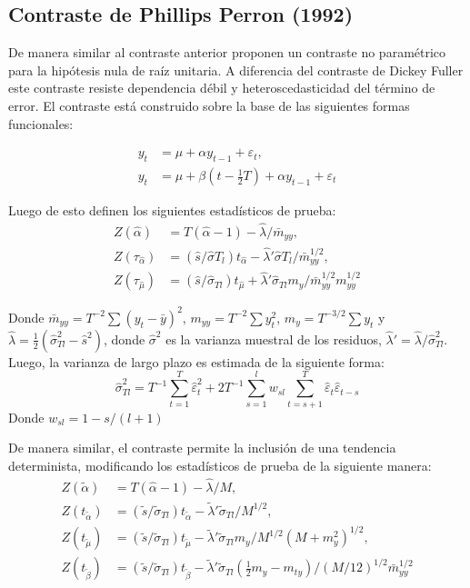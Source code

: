 \documentclass[12pt, twoside]{book}\usepackage[]{graphicx}\usepackage[]{color}
\numberwithin{equation}{section}
\numberwithin{theorem}{section}
\numberwithin{teorema}{section}
\numberwithin{defi}{section}
\numberwithin{prop}{section}
\numberwithin{defi}{section}
\theoremstyle{plain}
\begin{document}
\subsection{Contraste de Phillips Perron (1992)}

De manera similar al contraste anterior \cite{phillips1988} proponen un contraste no paramétrico para la hipótesis nula de raíz unitaria. A diferencia del contraste de Dickey Fuller este contraste resiste dependencia débil y heteroscedasticidad del término de error. El contraste está construido sobre la base de las siguientes formas funcionales: 

\begin{align}
y_{t} & = \mu+\alpha y_{t-1}+\varepsilon_{t}, \\ 
y_{t} & = \mu+\beta\left(t-\frac{1}{2}T\right)+\alpha y_{t-1}+\varepsilon_{t}
\end{align}

Luego de esto definen los siguientes estadísticos de prueba: 
\begin{align}
Z(\hat{\alpha}) & = T(\hat{\alpha}-1)-\hat{\lambda}/\bar{m}_{yy}, \label{eq:pp1}\\ 
Z(\tau_{\hat{\alpha}}) & = (\hat{s}/\hat{\sigma}T_{l})t_{\hat{\alpha}}-\hat{\lambda}'\hat{\sigma}T_{l}/\bar{m}^{1/2}_{yy}, \\ 
Z(\tau_{\hat{\mu}}) & = (\hat{s}/\hat{\sigma}_{Tl})t_{\hat{\mu}}+\hat{\lambda}'\hat{\sigma}_{Tl}m_{y}/\bar{m}^{1/2}_{yy}m^{1/2}_{yy} \label{eq:pp3}
\end{align}

Donde $\bar{m}_{yy}=T^{-2}\sum (y_{t}-\bar{y})^{2}$, $m_{yy}=T^{-2}\sum y_{t}^{2}$, $m_{y}=T^{-3/2}\sum y_{t}$ y $\hat{\lambda} = \frac{1}{2}(\hat{\sigma}^{2}_{Tl}-\hat{s} ^{2})$, donde $\hat{\sigma}^{2}$ es la varianza muestral de los residuos, $\hat{\lambda}'=\hat{\lambda}/\hat{\sigma}^{2}_{Tl}$. Luego, la varianza de largo plazo es estimada de la siguiente forma: 
\begin{equation}
\hat{\sigma}^{2}_{Tl}=T^{-1}\sum_{t=1}^{T}\hat{\varepsilon}_{t}^{2}+2T^{-1}\sum_{s=1}^{l}w_{sl}\sum_{t=s+1}^{T}\hat{\varepsilon}_{t}\hat{\varepsilon}_{t-s}
\end{equation}
Donde $w_{sl}=1-s/(l+1)$

De manera similar, el contraste permite la inclusión de una tendencia determinista, modificando los estadísticos de prueba de la siguiente manera: 
\begin{align}
Z(\tilde{\alpha})  & = T(\hat{\alpha}-1)-\hat{\lambda}/M, \\ 
Z(t_{\tilde{\alpha}}) & = (\tilde{s}/\tilde{\sigma}_{Tl})t_{\tilde{\alpha}}-\tilde{\lambda}'\tilde{\sigma}_{Tl}/M^{1/2}, \\ 
Z(t_{\tilde{\mu}}) & = (\tilde{s}/\tilde{\sigma}_{Tl})t_{\tilde{\mu}}-\tilde{\lambda}'\tilde{\sigma}_{Tl}m_{y}/M^{1/2}(M+m_{y}^{2})^{1/2}, \\
Z(t_{\tilde{\beta}}) & = (\tilde{s}/\tilde{\sigma}_{Tl})t_{\tilde{\beta}}-\tilde{\lambda}'\tilde{\sigma}_{Tl}\left(\frac{1}{2}m_{y}-m_{ty}\right)/(M/12)^{1/2}\bar{m}_{yy}^{1/2}
\end{align}
\end{document}
